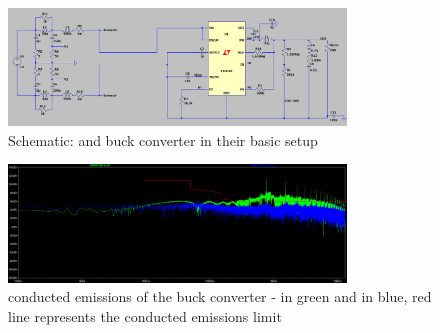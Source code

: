 \begin{figure}[h]
    \centering
    \includegraphics[width=0.8\textwidth]{img/schematic_no_nothing.png}
    \caption{Schematic:  and buck converter in their basic setup}
    \label{fig:no_nothing_schematic}
\end{figure}

\begin{figure}[h]
    \centering
    \includegraphics[width=0.8\textwidth]{img/emc_no_nothing.png}
    \caption{conducted emissions of the buck converter -  in green and  in blue, red line represents the conducted emissions limit}
    \label{fig:no_nothing_emc}
\end{figure}



